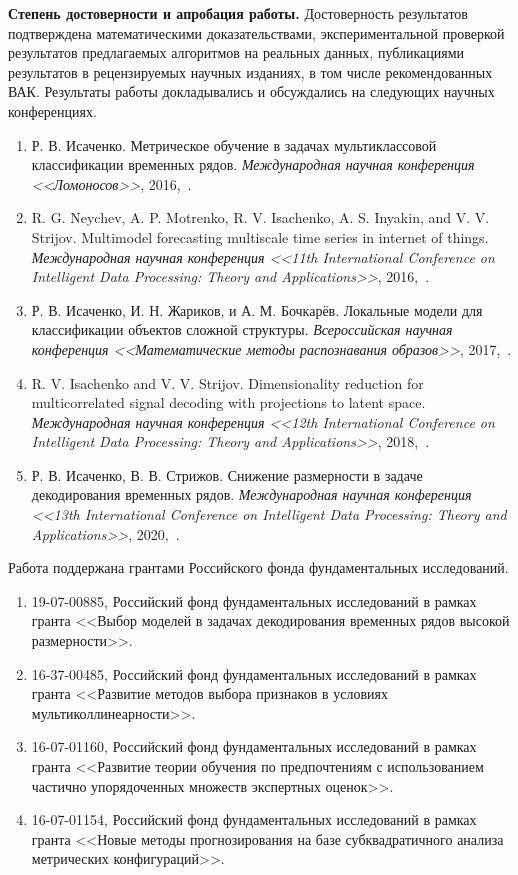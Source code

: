 \vspace{0.5cm}
\textbf{Степень достоверности и апробация работы.}
Достоверность результатов подтверждена математическими доказательствами, экспериментальной проверкой результатов предлагаемых алгоритмов на реальных данных, публикациями результатов в рецензируемых научных изданиях, в том числе рекомендованных ВАК. 
Результаты работы докладывались и обсуждались на следующих научных конференциях.
\begin{enumerate}
	\item Р. В. Исаченко. Метрическое обучение в задачах мультиклассовой классификации временных рядов. \textit{Международная научная конференция <<Ломоносов>>}, 2016,~\cite{isachenko2016lomonosov}.
	\item R. G. Neychev, A. P. Motrenko, R. V. Isachenko, A. S. Inyakin, and V. V. Strijov. Multimodel forecasting multiscale time series in internet of things. \textit{Международная научная конференция  <<11th International Conference on Intelligent Data Processing: Theory and Applications>>}, 2016,~\cite{Neychev2016IDP}.
	\item Р. В. Исаченко, И. Н. Жариков, и А. М. Бочкарёв. Локальные модели для классификации объектов сложной структуры. \textit{Всероссийская научная конференция <<Математические методы распознавания образов>>}, 2017,~\cite{isachenko2017localmmro}.
	\item R. V. Isachenko and V. V. Strijov. Dimensionality reduction for multicorrelated signal decoding with projections to latent space. \textit{Международная научная конференция  <<12th International Conference on Intelligent Data Processing: Theory and Applications>>}, 2018,~\cite{Isachenko2018plsidp}.
	\item Р. В. Исаченко, В. В. Стрижов. Снижение размерности в задаче декодирования временных рядов. \textit{Международная научная конференция  <<13th International Conference on Intelligent Data Processing: Theory and Applications>>}, 2020,~\cite{Isachenko2020plsidp}.
\end{enumerate} 

Работа поддержана грантами Российского фонда фундаментальных исследований.
\begin{enumerate}
	\item 19-07-00885, Российский фонд фундаментальных исследований в рамках гранта <<Выбор моделей в задачах декодирования временных рядов высокой размерности>>.
	\item 16-37-00485, Российский фонд фундаментальных исследований в рамках гранта <<Развитие методов выбора признаков в условиях мультиколлинеарности>>.
	\item 16-07-01160, Российский фонд фундаментальных исследований в рамках гранта <<Развитие теории обучения по предпочтениям с использованием частично упорядоченных множеств экспертных оценок>>.
	\item 16-07-01154, Российский фонд фундаментальных исследований в рамках гранта <<Новые методы прогнозирования на базе субквадратичного анализа метрических конфигураций>>.
\end{enumerate}


